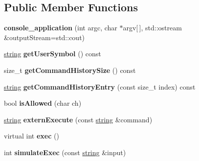 \subsection*{\-Public \-Member \-Functions}
\begin{DoxyCompactItemize}
\item 
\hypertarget{classmbdev_1_1console__application_a3ec9a999cbcb3be3f27ace507b18edb2}{{\bfseries console\-\_\-application} (int argc, char $\ast$argv\mbox{[}$\,$\mbox{]}, std\-::ostream \&output\-Stream=std\-::cout)}\label{classmbdev_1_1console__application_a3ec9a999cbcb3be3f27ace507b18edb2}

\item 
\hypertarget{classmbdev_1_1console__application_ad157a0ef8d992092b8d9d14e7f621073}{\hyperlink{classmbdev_1_1string}{string} {\bfseries get\-User\-Symbol} () const }\label{classmbdev_1_1console__application_ad157a0ef8d992092b8d9d14e7f621073}

\item 
\hypertarget{classmbdev_1_1console__application_a311506abcf542bc78385f447171b3b7d}{size\-\_\-t {\bfseries get\-Command\-History\-Size} () const }\label{classmbdev_1_1console__application_a311506abcf542bc78385f447171b3b7d}

\item 
\hypertarget{classmbdev_1_1console__application_af0c2e1dc86119c3da094dd00a0c6bdb2}{\hyperlink{classmbdev_1_1string}{string} {\bfseries get\-Command\-History\-Entry} (const size\-\_\-t index) const }\label{classmbdev_1_1console__application_af0c2e1dc86119c3da094dd00a0c6bdb2}

\item 
\hypertarget{classmbdev_1_1console__application_a58242f26b9b2b32faa2525bea0f6eecd}{bool {\bfseries is\-Allowed} (char ch)}\label{classmbdev_1_1console__application_a58242f26b9b2b32faa2525bea0f6eecd}

\item 
\hypertarget{classmbdev_1_1console__application_aaf462b9a5c8764896c8c2bf2f12271e1}{\hyperlink{classmbdev_1_1string}{string} {\bfseries extern\-Execute} (const \hyperlink{classmbdev_1_1string}{string} \&command)}\label{classmbdev_1_1console__application_aaf462b9a5c8764896c8c2bf2f12271e1}

\item 
\hypertarget{classmbdev_1_1console__application_a4da56afaaaf53820dde5551ae34bc8da}{virtual int {\bfseries exec} ()}\label{classmbdev_1_1console__application_a4da56afaaaf53820dde5551ae34bc8da}

\item 
\hypertarget{classmbdev_1_1console__application_aaba2a906eb64593cc43ceec6ad96e830}{int {\bfseries simulate\-Exec} (const \hyperlink{classmbdev_1_1string}{string} \&input)}\label{classmbdev_1_1console__application_aaba2a906eb64593cc43ceec6ad96e830}

\end{DoxyCompactItemize}
